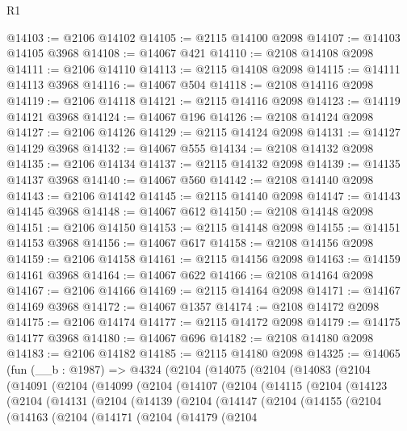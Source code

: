 \begin{lexlean}{R1}
\begin{coremodule}
@14103 := @2106 @14102
@14105 := @2115 @14100 @2098
@14107 := @14103 @14105 @3968
@14108 := @14067 @421
@14110 := @2108 @14108 @2098
@14111 := @2106 @14110
@14113 := @2115 @14108 @2098
@14115 := @14111 @14113 @3968
@14116 := @14067 @504
@14118 := @2108 @14116 @2098
@14119 := @2106 @14118
@14121 := @2115 @14116 @2098
@14123 := @14119 @14121 @3968
@14124 := @14067 @196
@14126 := @2108 @14124 @2098
@14127 := @2106 @14126
@14129 := @2115 @14124 @2098
@14131 := @14127 @14129 @3968
@14132 := @14067 @555
@14134 := @2108 @14132 @2098
@14135 := @2106 @14134
@14137 := @2115 @14132 @2098
@14139 := @14135 @14137 @3968
@14140 := @14067 @560
@14142 := @2108 @14140 @2098
@14143 := @2106 @14142
@14145 := @2115 @14140 @2098
@14147 := @14143 @14145 @3968
@14148 := @14067 @612
@14150 := @2108 @14148 @2098
@14151 := @2106 @14150
@14153 := @2115 @14148 @2098
@14155 := @14151 @14153 @3968
@14156 := @14067 @617
@14158 := @2108 @14156 @2098
@14159 := @2106 @14158
@14161 := @2115 @14156 @2098
@14163 := @14159 @14161 @3968
@14164 := @14067 @622
@14166 := @2108 @14164 @2098
@14167 := @2106 @14166
@14169 := @2115 @14164 @2098
@14171 := @14167 @14169 @3968
@14172 := @14067 @1357
@14174 := @2108 @14172 @2098
@14175 := @2106 @14174
@14177 := @2115 @14172 @2098
@14179 := @14175 @14177 @3968
@14180 := @14067 @696
@14182 := @2108 @14180 @2098
@14183 := @2106 @14182
@14185 := @2115 @14180 @2098
@14325 := @14065
    (fun (__b : @1987) =>
    @4324
      (@2104
        (@14075
          (@2104
            (@14083
              (@2104
                (@14091
                  (@2104
                    (@14099
                      (@2104
                        (@14107
                          (@2104
                            (@14115
                              (@2104
                                (@14123
                                  (@2104
                                    (@14131
                                      (@2104
                                        (@14139
                                          (@2104
                                            (@14147
                                              (@2104
                                                (@14155
                                                  (@2104
                                                    (@14163
                                                      (@2104
                                                        (@14171
                                                          (@2104
                                                            (@14179
                                                              (@2104

\end{coremodule}
\end{lexlean}

